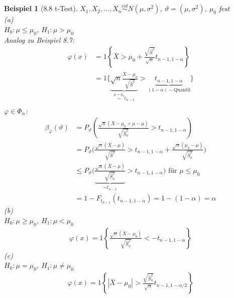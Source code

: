\documentclass[a4paper,openany]{book}
\theoremstyle{mytheoremstyle}
\newtheorem*{bei}{Beispiel}
\theoremstyle{mytheoremstyle2}
\begin{document}
\begin{bei}[8.8 t-Test]
  $X_1,X_2,...,X_n \overset{iid}\sim N(\mu ,\sigma ^2)$, $\vartheta =(\mu ,\sigma ^2)$, $\mu _0$ fest \\
  (a)\\
  $H_0:\mu \leq \mu _0$, $H_1:\mu > \mu _0$  \\
  Analog zu Beispiel 8.7: 
  \begin{align*}
    \varphi (x)&=1 \left\{\bar{X}>\mu _0+\frac{\sqrt{\hat{S}^2}}{\sqrt{n}}t _{n-1,1- \alpha }\right\}\\
               &=1 \bigg\{\underbrace{\sqrt{n}\frac{\bar{X}-\mu _0}{\sqrt{\hat{S}^2}}}_{\overset{\mu =\mu _0}\sim t _{n-1}}>\underbrace{t _{n-1,1-\alpha }}_{(1-\alpha )-\text{Quantil}}\bigg\} \\
               &\qquad 
  \end{align*}
  $\varphi \in \Phi _{\alpha }$:
  \begin{align*}
    \beta _{\varphi }(\vartheta )
    &= P _{\vartheta }\left(\frac{\sqrt{n}(\bar{X}-\mu _0+\mu -\mu )}{\sqrt{\hat{S}_n^2}}
    >t _{n-1,1-\alpha }\right) \\
    &=P _{\vartheta }\bigg(\frac{\sqrt{n}(\bar{X}-\mu) }{\sqrt{\hat{S}^2}}>t _{n-1,1-\alpha }+\frac{\sqrt{n}({\mu _0-\mu} )}{\sqrt{\hat{S}_n^2}}\bigg) \\
    &\leq P _{\vartheta }\bigg(\underbrace{\frac{\sqrt{n}(\bar{X}-\mu )}{\sqrt{\hat{S}_n^2}}}_{\sim t _{n-1}}>t _{n-1,1-\alpha }\bigg)\text{ für }\mu \leq \mu _0 \\
    &=1-F _{t _{n-1}}(t _{n-1,1-\alpha })=1-(1-\alpha )=\alpha 
  \end{align*}
  (b)\\
  $H_0:\mu \geq \mu _0$, $H_1:\mu < \mu _0$
  \begin{align*}
    \varphi (x)=1 \left\{\frac{\sqrt{n}(\bar{X}-\mu _0)}{\sqrt{\hat{S}_n^2}}<- t _{n-1,1-\alpha }\right\}
  \end{align*}
  (c)\\
  $H_0:\mu =\mu _0$, $H_1:\mu  \neq \mu _0$
  \begin{align*}
    \varphi (x)=1 \left\{|\bar{X}-\mu _0|>\frac{\sqrt{\hat{S}_n^2}}{\sqrt{n}}t _{n-1,1-\alpha /2}\right\}
  \end{align*}
\end{bei}
\end{document}
